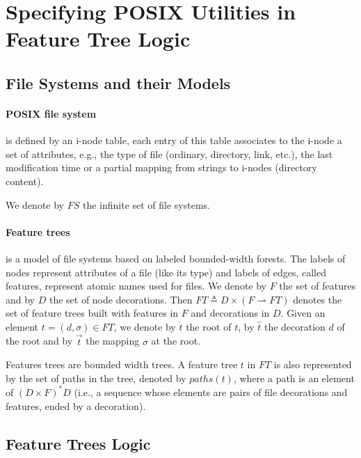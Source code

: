 
\section{Specifying POSIX Utilities in Feature Tree Logic}

\subsection{File Systems and their Models}

\paragraph{POSIX file system}
is defined by an i-node table,
        each entry of this table associates to the i-node a set of attributes,
        e.g., the type of file (ordinary, directory, link, etc.),
              the last modification time or
              a partial mapping from strings to i-nodes (directory content).

We denote by $FS$ the infinite set of file systems.

\paragraph{Feature trees}
is a model of file systems based on labeled bounded-width forests.
The labels of nodes represent attributes of a file (like its type) and
labels of edges, called features, represent atomic names used for files.
We denote by $F$ the set of features and by $D$ the set of node decorations.
Then $FT \triangleq D \times (F \rightharpoonup FT)$ denotes the set of feature
trees built with features in $F$ and decorations in $D$.
Given an element $t=(d,\sigma)\in FT$, we denote
by $\dot{t}$ the root of $t$,
by $\hat{t}$ the decoration $d$ of the root and
by $\vec{t}$ the mapping $\sigma$ at the root.

Features trees are bounded width trees.
A feature tree $t$ in $FT$ is also represented by the set of paths in the tree,
denoted by $paths(t)$, where
a path is an element of $(D\times F)^*D$
(i.e., a sequence whose elements are pairs of
        file decorations 
    and features,
ended by a decoration).

\subsection{Feature Trees Logic}

